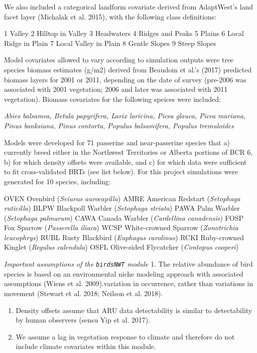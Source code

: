 \documentclass[]{article}
\begin{document}
We also included a categorical landform covariate derived from
AdaptWest's land facet layer (Michalak et al. 2015), with the following
class definitions:

1 Valley 2 Hilltop in Valley 3 Headwaters 4 Ridges and Peaks 5 Plains 6
Local Ridge in Plain 7 Local Valley in Plain 8 Gentle Slopes 9 Steep
Slopes

Model covariates allowed to vary according to simulation outputs were
tree species biomass estimates (g/m2) derived from Beaudoin et al.'s
(2017) predicted biomass layers for 2001 or 2011, depending on the date
of survey (pre-2006 was associated with 2001 vegetation; 2006 and later
was associated with 2011 vegetation). Biomass covariates for the
following speices were included:

\emph{Abies balsamea, Betula papyrifera, Larix laricina, Picea glauca,
Picea mariana, Pinus banksiana, Pinus contorta, Populus balsamifera,
Populus tremuloides}

Models were developed for 71 passerine and near-passerine species that
a) currently breed either in the Northwest Territories or Alberta
portions of BCR 6, b) for which density offsets were available, and c)
for which data were sufficient to fit cross-validated BRTs (see list
below). For this project simulations were generated for 10 species,
including:

OVEN Ovenbird (\emph{Seiurus aurocapilla}) AMRE American Redstart
(\emph{Setophaga ruticilla}) BLPW Blackpoll Warbler (\emph{Setophaga
striata}) PAWA Palm Warbler (\emph{Setophaga palmarum}) CAWA Canada
Warbler (\emph{Cardellina canadensis}) FOSP Fox Sparrow
(\emph{Passerella iliaca}) WCSP White-crowned Sparrow (\emph{Zonotrichia
leucophrys}) RUBL Rusty Blackbird (\emph{Euphagus carolinus}) RCKI
Ruby-crowned Kinglet (\emph{Regulus calendula}) OSFL Olive-sided
Flycatcher (\emph{Contopus cooperi})

\emph{Important assumptions of the \texttt{birdsNWT} module} 1. The
relative abundance of bird species is based on an environmental niche
modeling approach with associated assumptions (Wiens et al.
2009).variation in occurrence, rather than variations in movement
(Stewart et al. 2018; Neilson et al. 2018).

\begin{enumerate}
\def\labelenumi{\arabic{enumi}.}
\setcounter{enumi}{1}
\item
  Density offsets assume that ARU data detectability is similar to
  detectability by human observers (sensu Yip et al. 2017).
\item
  We assume a lag in vegetation response to climate and therefore do not
  include climate covariates within this module.
\end{enumerate}
\end{document}

